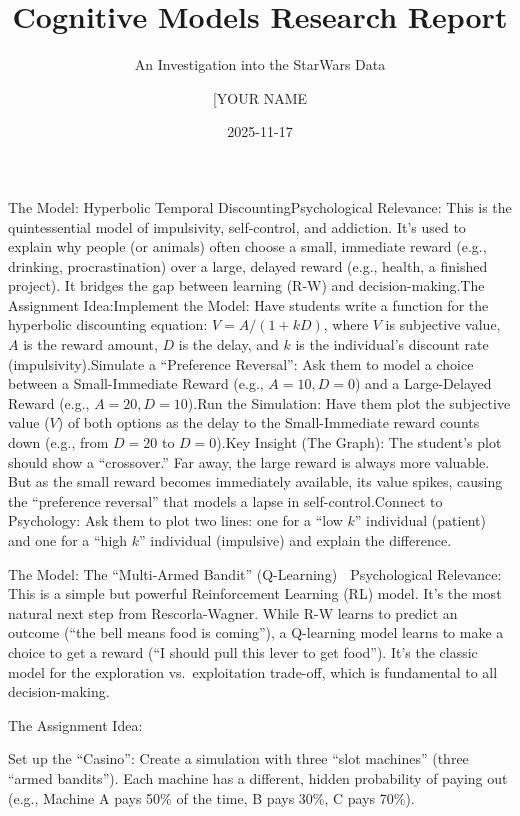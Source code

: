 \documentclass[
]{article}
\title{Cognitive Models Research Report}
\subtitle{An Investigation into the StarWars Data}
\author{{[}YOUR NAME}
\date{2025-11-17}
\begin{document}
\maketitle

{
\setcounter{tocdepth}{2}
\tableofcontents
}
The Model: Hyperbolic Temporal DiscountingPsychological Relevance: This
is the quintessential model of impulsivity, self-control, and addiction.
It's used to explain why people (or animals) often choose a small,
immediate reward (e.g., drinking, procrastination) over a large, delayed
reward (e.g., health, a finished project). It bridges the gap between
learning (R-W) and decision-making.The Assignment Idea:Implement the
Model: Have students write a function for the hyperbolic discounting
equation: \(V = A / (1 + kD)\), where \(V\) is subjective value, \(A\)
is the reward amount, \(D\) is the delay, and \(k\) is the individual's
discount rate (impulsivity).Simulate a ``Preference Reversal'': Ask them
to model a choice between a Small-Immediate Reward (e.g., \(A=10, D=0\))
and a Large-Delayed Reward (e.g., \(A=20, D=10\)).Run the Simulation:
Have them plot the subjective value (\(V\)) of both options as the delay
to the Small-Immediate reward counts down (e.g., from \(D=20\) to
\(D=0\)).Key Insight (The Graph): The student's plot should show a
``crossover.'' Far away, the large reward is always more valuable. But
as the small reward becomes immediately available, its value spikes,
causing the ``preference reversal'' that models a lapse in
self-control.Connect to Psychology: Ask them to plot two lines: one for
a ``low \(k\)'' individual (patient) and one for a ``high \(k\)''
individual (impulsive) and explain the difference.

The Model: The ``Multi-Armed Bandit'' (Q-Learning) 🎰 Psychological
Relevance: This is a simple but powerful Reinforcement Learning (RL)
model. It's the most natural next step from Rescorla-Wagner. While R-W
learns to predict an outcome (``the bell means food is coming''), a
Q-learning model learns to make a choice to get a reward (``I should
pull this lever to get food''). It's the classic model for the
exploration vs.~exploitation trade-off, which is fundamental to all
decision-making.

The Assignment Idea:

Set up the ``Casino'': Create a simulation with three ``slot machines''
(three ``armed bandits''). Each machine has a different, hidden
probability of paying out (e.g., Machine A pays 50\% of the time, B pays
30\%, C pays 70\%).
\end{document}
